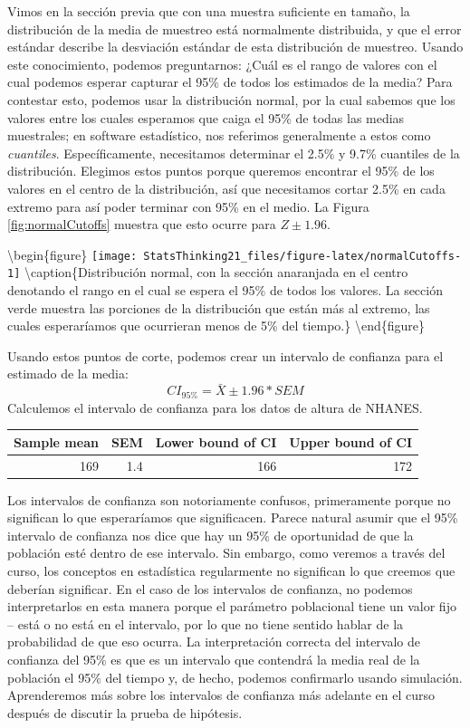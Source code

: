 \documentclass[
  12pt,
]{book}
\begin{document}
Vimos en la sección previa que con una muestra suficiente en tamaño, la distribución de la media de muestreo está normalmente distribuida, y que el error estándar describe la desviación estándar de esta distribución de muestreo. Usando este conocimiento, podemos preguntarnos: ¿Cuál es el rango de valores con el cual podemos esperar capturar el 95\% de todos los estimados de la media? Para contestar esto, podemos usar la distribución normal, por la cual sabemos que los valores entre los cuales esperamos que caiga el 95\% de todas las medias muestrales; en software estadístico, nos referimos generalmente a estos como \emph{cuantiles}. Específicamente, necesitamos determinar el 2.5\% y 9.7\% cuantiles de la distribución. Elegimos estos puntos porque queremos encontrar el 95\% de los valores en el centro de la distribución, así que necesitamos cortar 2.5\% en cada extremo para así poder terminar con 95\% en el medio. La Figura \ref{fig:normalCutoffs} muestra que esto ocurre para \(Z \pm 1.96\).

\textbackslash begin\{figure\}
\texttt{[image: StatsThinking21\_files/figure-latex/normalCutoffs-1]} \textbackslash caption\{Distribución normal, con la sección anaranjada en el centro denotando el rango en el cual se espera el 95\% de todos los valores. La sección verde muestra las porciones de la distribución que están más al extremo, las cuales esperaríamos que ocurrieran menos de 5\% del tiempo.\}\label{fig:normalCutoffs}
\textbackslash end\{figure\}

Usando estos puntos de corte, podemos crear un intervalo de confianza para el estimado de la media:
\[
CI_{95\%} = \bar{X} \pm 1.96*SEM
\]
Calculemos el intervalo de confianza para los datos de altura de NHANES.

\begin{tabular}{r|r|r|r}
\hline
Sample mean & SEM & Lower bound of CI & Upper bound of CI\\
\hline
169 & 1.4 & 166 & 172\\
\hline
\end{tabular}

Los intervalos de confianza son notoriamente confusos, primeramente porque no significan lo que esperaríamos que significacen. Parece natural asumir que el 95\% intervalo de confianza nos dice que hay un 95\% de oportunidad de que la población esté dentro de ese intervalo. Sin embargo, como veremos a través del curso, los conceptos en estadística regularmente no significan lo que creemos que deberían significar. En el caso de los intervalos de confianza, no podemos interpretarlos en esta manera porque el parámetro poblacional tiene un valor fijo -- está o no está en el intervalo, por lo que no tiene sentido hablar de la probabilidad de que eso ocurra. La interpretación correcta del intervalo de confianza del 95\% es que es un intervalo que contendrá la media real de la población el 95\% del tiempo y, de hecho, podemos confirmarlo usando simulación. Aprenderemos más sobre los intervalos de confianza más adelante en el curso después de discutir la prueba de hipótesis.
\end{document}
